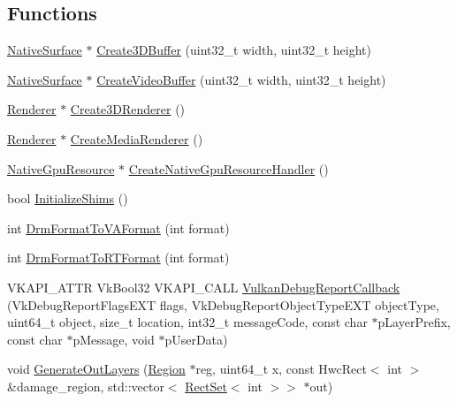 \subsection*{Functions}
\begin{DoxyCompactItemize}
\item 
\mbox{\hyperlink{classhwcomposer_1_1NativeSurface}{Native\+Surface}} $\ast$ \mbox{\hyperlink{namespacehwcomposer_a0052e66c56b527255f759b8eb871ee46}{Create3\+D\+Buffer}} (uint32\+\_\+t width, uint32\+\_\+t height)
\item 
\mbox{\hyperlink{classhwcomposer_1_1NativeSurface}{Native\+Surface}} $\ast$ \mbox{\hyperlink{namespacehwcomposer_afc63dc69f28b901e0382238adab4ef86}{Create\+Video\+Buffer}} (uint32\+\_\+t width, uint32\+\_\+t height)
\item 
\mbox{\hyperlink{classhwcomposer_1_1Renderer}{Renderer}} $\ast$ \mbox{\hyperlink{namespacehwcomposer_a047e8ab5b02a38ea456d0ec084775144}{Create3\+D\+Renderer}} ()
\item 
\mbox{\hyperlink{classhwcomposer_1_1Renderer}{Renderer}} $\ast$ \mbox{\hyperlink{namespacehwcomposer_ac362b254e3d0f52a07523e5046c1dfdd}{Create\+Media\+Renderer}} ()
\item 
\mbox{\hyperlink{classhwcomposer_1_1NativeGpuResource}{Native\+Gpu\+Resource}} $\ast$ \mbox{\hyperlink{namespacehwcomposer_a37cb4c79bf84a69887ed09adb9c5b4b0}{Create\+Native\+Gpu\+Resource\+Handler}} ()
\item 
bool \mbox{\hyperlink{namespacehwcomposer_a1e2712274f1d2ee3a6b1662cca909699}{Initialize\+Shims}} ()
\item 
int \mbox{\hyperlink{namespacehwcomposer_a74da6820276a700b866ddcb92330b81b}{Drm\+Format\+To\+V\+A\+Format}} (int format)
\item 
int \mbox{\hyperlink{namespacehwcomposer_a487f8d9f8fe8490d7057be9a1c67b42e}{Drm\+Format\+To\+R\+T\+Format}} (int format)
\item 
V\+K\+A\+P\+I\+\_\+\+A\+T\+TR Vk\+Bool32 V\+K\+A\+P\+I\+\_\+\+C\+A\+LL \mbox{\hyperlink{namespacehwcomposer_ab5ff410afa97573ec31178666d2d00bb}{Vulkan\+Debug\+Report\+Callback}} (Vk\+Debug\+Report\+Flags\+E\+XT flags, Vk\+Debug\+Report\+Object\+Type\+E\+XT object\+Type, uint64\+\_\+t object, size\+\_\+t location, int32\+\_\+t message\+Code, const char $\ast$p\+Layer\+Prefix, const char $\ast$p\+Message, void $\ast$p\+User\+Data)
\item 
void \mbox{\hyperlink{namespacehwcomposer_a5851b0d99b50a9c09b2fe735d8877099}{Generate\+Out\+Layers}} (\mbox{\hyperlink{structhwcomposer_1_1Region}{Region}} $\ast$reg, uint64\+\_\+t x, const Hwc\+Rect$<$ int $>$ \&damage\+\_\+region, std\+::vector$<$ \mbox{\hyperlink{structhwcomposer_1_1RectSet}{Rect\+Set}}$<$ int $>$$>$ $\ast$out)
$$
\end{DoxyCompactItemize}
